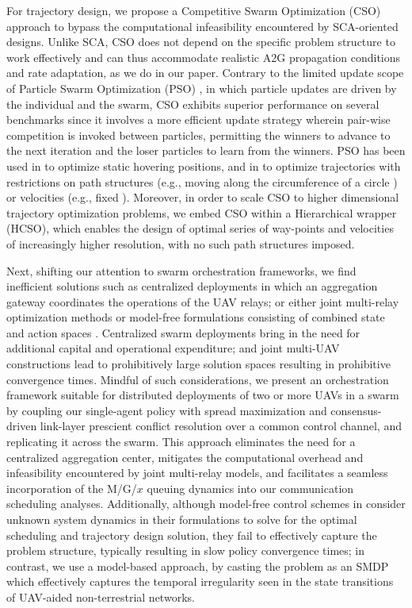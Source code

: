 \documentclass[12pt, draftcls, onecolumn]{IEEEtran}
\theoremstyle{plain}
\theoremstyle{definition}
\theoremstyle{remark}
\begin{document}
For trajectory design, we propose a Competitive Swarm Optimization (CSO) \cite{CSO} approach to bypass the computational infeasibility encountered by SCA-oriented designs. Unlike SCA, CSO does not depend on the specific problem structure to work effectively and can thus accommodate realistic A2G propagation conditions and rate adaptation, as we do in our paper. Contrary to the limited update scope of Particle Swarm Optimization (PSO) \cite{PSO}, in which particle updates are driven by the individual and the swarm, CSO exhibits superior performance on several benchmarks \cite{CSO} since it involves a more efficient update strategy wherein pair-wise competition is invoked between particles, permitting the winners to advance to the next iteration and the loser particles to learn from the winners. PSO has been used in \cite{Efficient3DPlacementPSO, 3DDeploymentPSO} to optimize static hovering positions, and in \cite{PSOPathStructure,PAoI} to optimize trajectories with restrictions on path structures (e.g., moving along the circumference of a circle \cite{PSOPathStructure}) or velocities (e.g., fixed \cite{PAoI}). Moreover, in order to scale CSO to higher dimensional trajectory optimization problems, we embed CSO within a Hierarchical wrapper (HCSO), which enables the design of optimal series of way-points and velocities of increasingly higher resolution, with no such path structures imposed.

Next, shifting our attention to swarm orchestration frameworks, we find inefficient solutions such as centralized deployments \cite{JointTrajectoryDesign, MultiDroneDeployment, CSCA-ADMM} in which an aggregation gateway coordinates the operations of the UAV relays; or either joint multi-relay optimization methods \cite{CSCA-ADMM, GameTheory, UAVDynamicCoverage} or model-free formulations consisting of combined state and action spaces \cite{DDQN, MEC-DDPG, DQNPositioning, MLDeployment}. Centralized swarm deployments bring in the need for additional capital and operational expenditure; and joint multi-UAV constructions lead to prohibitively large solution spaces resulting in prohibitive convergence times. Mindful of such considerations, we present an orchestration framework suitable for distributed deployments of two or more UAVs in a swarm by coupling our single-agent policy with spread maximization and consensus-driven link-layer prescient conflict resolution over a common control channel, and replicating it across the swarm. This approach eliminates the need for a centralized aggregation center, mitigates the computational overhead and infeasibility encountered by joint multi-relay models, and facilitates a seamless incorporation of the M/G/$x$ queuing dynamics into our communication scheduling analyses. Additionally, although model-free control schemes in \cite{DDQN, MEC-DDPG, RLSenseSend, DQNPositioning, MLDeployment} consider unknown system dynamics in their formulations to solve for the optimal scheduling and trajectory design solution, they fail to effectively capture the problem structure, typically resulting in slow policy convergence times; in contrast, we use a model-based approach, by casting the problem as an SMDP which effectively captures the temporal irregularity seen in the state transitions of UAV-aided non-terrestrial networks.
\end{document}
